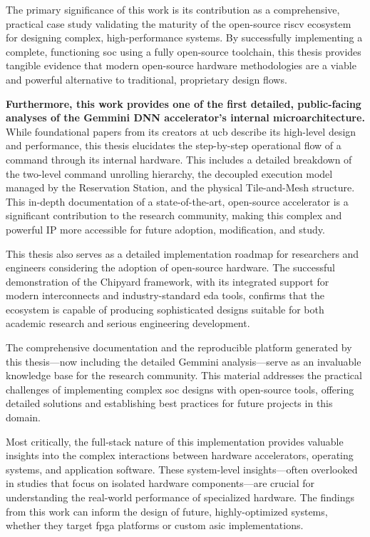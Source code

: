 The primary significance of this work is its contribution as a comprehensive, practical case study validating the maturity of the open-source \acrshort{riscv} ecosystem for designing complex, high-performance systems. By successfully implementing a complete, functioning \acrshort{soc} using a fully open-source toolchain, this thesis provides tangible evidence that modern open-source hardware methodologies are a viable and powerful alternative to traditional, proprietary design flows.

\textbf{Furthermore, this work provides one of the first detailed, public-facing analyses of the Gemmini DNN accelerator's internal microarchitecture.} While foundational papers from its creators at \acrshort{ucb} describe its high-level design and performance, this thesis elucidates the step-by-step operational flow of a command through its internal hardware. This includes a detailed breakdown of the two-level command unrolling hierarchy, the decoupled execution model managed by the Reservation Station, and the physical Tile-and-Mesh structure. This in-depth documentation of a state-of-the-art, open-source accelerator is a significant contribution to the research community, making this complex and powerful IP more accessible for future adoption, modification, and study.

This thesis also serves as a detailed implementation roadmap for researchers and engineers considering the adoption of open-source hardware. The successful demonstration of the Chipyard framework, with its integrated support for modern interconnects and industry-standard \acrshort{eda} tools, confirms that the ecosystem is capable of producing sophisticated designs suitable for both academic research and serious engineering development.

The comprehensive documentation and the reproducible platform generated by this thesis—now including the detailed Gemmini analysis—serve as an invaluable knowledge base for the research community. This material addresses the practical challenges of implementing complex \acrshort{soc} designs with open-source tools, offering detailed solutions and establishing best practices for future projects in this domain.

Most critically, the full-stack nature of this implementation provides valuable insights into the complex interactions between hardware accelerators, operating systems, and application software. These system-level insights—often overlooked in studies that focus on isolated hardware components—are crucial for understanding the real-world performance of specialized hardware. The findings from this work can inform the design of future, highly-optimized systems, whether they target \acrshort{fpga} platforms or custom \acrshort{asic} implementations.

